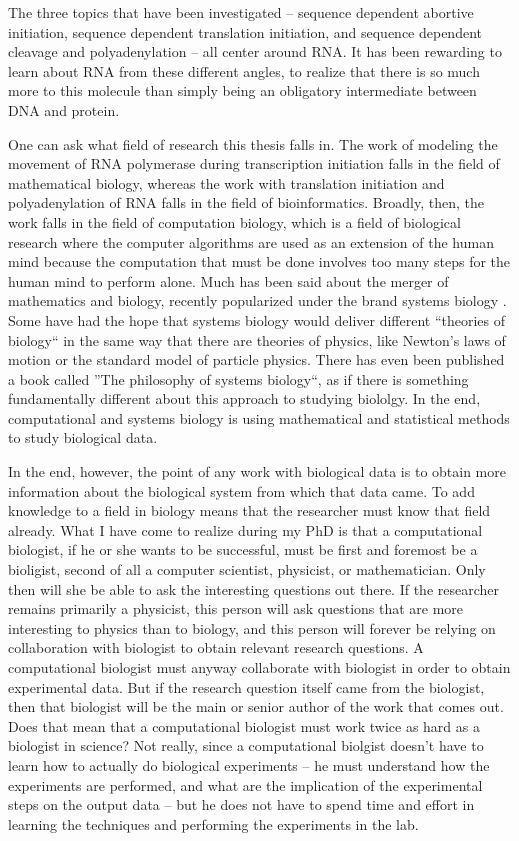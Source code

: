 %
The three topics that have been investigated -- sequence dependent abortive
initiation, sequence dependent translation initiation, and sequence dependent
cleavage and polyadenylation -- all center around RNA. It has been rewarding to
learn about RNA from these different angles, to realize that there is so much
more to this molecule than simply being an obligatory intermediate between DNA
and protein.

One can ask what field of research this thesis falls in. The work of modeling
the movement of RNA polymerase during transcription initiation falls in the
field of mathematical biology, whereas the work with translation initiation and
polyadenylation of RNA falls in the field of bioinformatics. Broadly, then, the
work falls in the field of computation biology, which is a field of biological
research where the computer algorithms are used as an extension of the human
mind because the computation that must be done involves too many steps for the
human mind to perform alone. Much has been said about the merger of mathematics
and biology, recently popularized under the brand systems biology
\cite{kitano_systems_2002}. Some have had the hope that systems biology would
deliver different ``theories of biology`` in the same way that there are
theories of physics, like Newton's laws of motion or the standard model of
particle physics. There has even been published a book called ''The philosophy
of systems biology``, as if there is something fundamentally different about
this approach to studying biololgy. In the end, computational and systems
biology is using mathematical and statistical methods to study biological data.

In the end, however, the point of any work with biological data is to obtain
more information about the biological system from which that data came. To add
knowledge to a field in biology means that the researcher must know that field
already. What I have come to realize during my PhD is that a computational
biologist, if he or she wants to be successful, must be first and foremost be a
bioligist, second of all a computer scientist, physicist, or mathematician.
Only then will she be able to ask the interesting questions out there. If the
researcher remains primarily a physicist, this person will ask questions that
are more interesting to physics than to biology, and this person will forever
be relying on collaboration with biologist to obtain relevant research
questions. A computational biologist must anyway collaborate with biologist in
order to obtain experimental data. But if the research question itself came
from the biologist, then that biologist will be the main or senior author of
the work that comes out. Does that mean that a computational biologist must
work twice as hard as a biologist in science? Not really, since a computational
biolgist doesn't have to learn how to actually do biological experiments -- he
must understand how the experiments are performed, and what are the implication
of the experimental steps on the output data -- but he does not have to spend
time and effort in learning the techniques and performing the experiments in
the lab.

